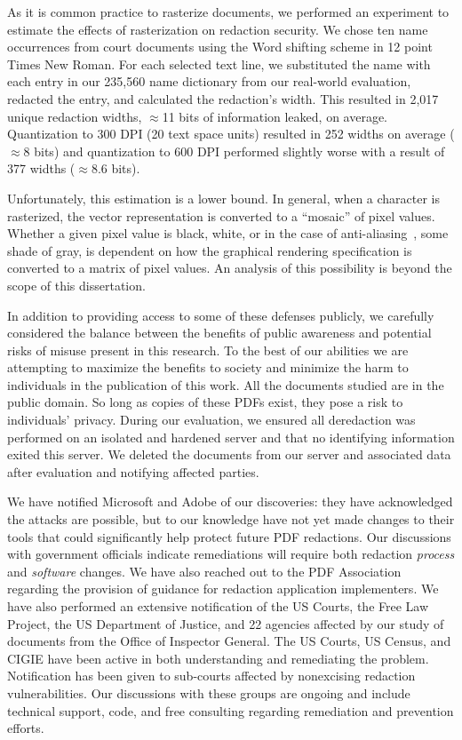 As it is common practice to rasterize documents, we performed an experiment to estimate the effects of rasterization on redaction security.
We chose ten name occurrences from court documents using the Word shifting scheme in 12 point Times New Roman.
For each selected text line, we substituted the name with each entry in our 235,560 name dictionary from our real-world evaluation, redacted the entry, and calculated the redaction's width.
This resulted in 2,017 unique redaction widths, $\approx$11 bits of information leaked, on average.
Quantization to 300 DPI (20 text space units) resulted in 252 widths on average ($\approx$8 bits) and quantization to 600 DPI performed slightly worse with a result of 377 widths ($\approx$8.6 bits).

Unfortunately, this estimation is a lower bound.
In general, when a character is rasterized, the vector representation is converted to a ``mosaic'' of pixel values.
Whether a given pixel value is black, white, or in the case of anti-aliasing~\cite{romanyuk2015method}, some shade of gray, is dependent on how the graphical rendering specification is converted to a matrix of pixel values.
An analysis of this possibility is beyond the scope of this dissertation.

In addition to providing access to some of these defenses publicly, we carefully considered the balance between the benefits of public awareness and potential risks of misuse present in this research.
To the best of our abilities we are attempting to maximize the benefits to society and minimize the harm to individuals in the publication of this work.
All the documents studied are in the public domain.
So long as copies of these PDFs exist, they pose a risk to individuals' privacy.
During our evaluation, we ensured all deredaction was performed on an isolated and hardened server and that no identifying information exited this server.
We deleted the documents from our server and associated data after evaluation and notifying affected parties.

We have notified Microsoft and Adobe of our discoveries: they have acknowledged the attacks are possible, but to our knowledge have not yet made changes to their tools that could significantly help protect future PDF redactions.
Our discussions with government officials indicate remediations will require both redaction \emph{process} and \emph{software} changes.
We have also reached out to the PDF Association regarding the provision of guidance for redaction application implementers.
We have also performed an extensive notification of the US Courts, the Free Law Project, the US Department of Justice, and 22 agencies affected by our study of documents from the Office of Inspector General.
The US Courts, US Census, and CIGIE have been active in both understanding and remediating the problem.
Notification has been given to sub-courts affected by nonexcising redaction vulnerabilities.
Our discussions with these groups are ongoing and include technical support, code, and free consulting regarding remediation and prevention efforts.

